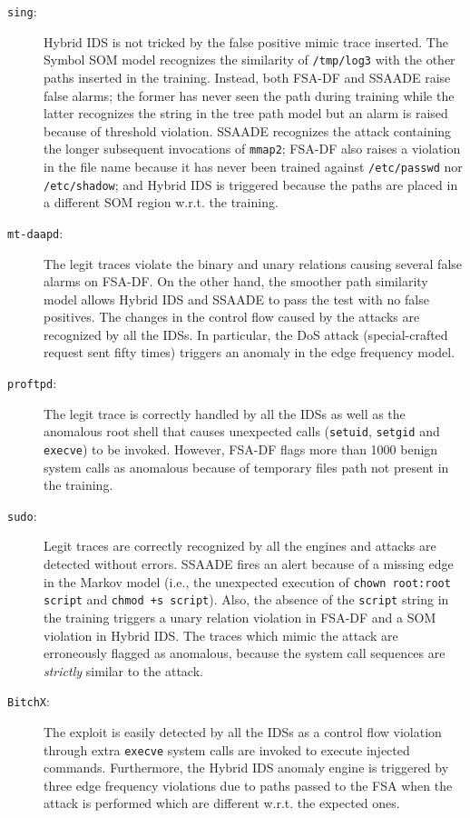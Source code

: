 \begin{description}
  \item [\texttt{sing}:] Hybrid IDS is not tricked by the false positive mimic trace inserted. The Symbol SOM model recognizes the similarity of \texttt{/tmp/log3} with the other paths inserted in the training. Instead, both FSA-DF and \ac{SSAADE} raise false alarms; the former has never seen the path during training while the latter recognizes the string in the tree path model but an alarm is raised because of threshold violation. \ac{SSAADE} recognizes the attack containing the longer subsequent invocations of \texttt{mmap2}; FSA-DF also raises a violation in the file name because it has never been trained against \texttt{/etc/passwd} nor \texttt{/etc/shadow}; and Hybrid IDS is triggered because the paths are placed in a different \ac{SOM} region w.r.t. the training.
  \item[\texttt{mt-daapd}:] The legit traces violate the binary and unary relations causing several false alarms on FSA-DF. On the other hand, the smoother path similarity model allows Hybrid IDS and \ac{SSAADE} to pass the test with no false positives. The changes in the control flow caused by the attacks are recognized by all the \acp{IDS}. In particular, the DoS attack (special-crafted request sent fifty times) triggers an anomaly in the edge frequency model.
  \item[\texttt{proftpd}:] The legit trace is correctly handled by all the \acp{IDS} as well as the anomalous root shell that causes unexpected calls (\verb#setuid#, \verb#setgid# and \verb#execve#) to be invoked. However, FSA-DF flags more than 1000 benign system calls as anomalous because of temporary files path not present in the training.
\item [\texttt{sudo}:] Legit traces are correctly recognized by all the engines and attacks are detected without errors. \ac{SSAADE} fires an alert because of a missing edge in the Markov model (i.e., the unexpected execution of \texttt{chown root:root script} and \texttt{chmod +s script}). Also, the absence of the \texttt{script} string in the training triggers a unary relation violation in FSA-DF and a \ac{SOM} violation in Hybrid IDS. The traces which mimic the attack are erroneously flagged as anomalous, because the system call sequences are \emph{strictly} similar to the attack.
\item [\texttt{BitchX}:] The exploit is easily detected by all the \acp{IDS} as a control flow violation through extra \texttt{execve} system calls are invoked to execute injected commands. Furthermore, the Hybrid IDS anomaly engine is triggered by three edge frequency violations due to paths passed to the \ac{FSA} when the attack is performed which are different w.r.t. the expected ones.
\end{description}

